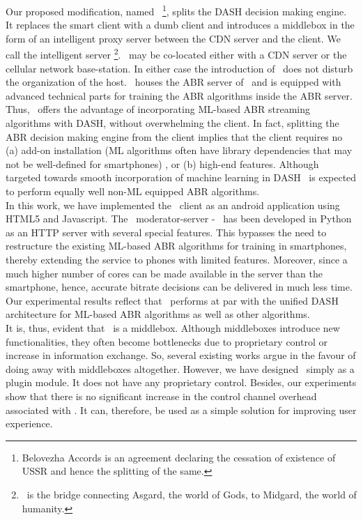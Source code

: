     \indent Our proposed modification, named \bel\ \footnote{Belovezha Accords is an agreement declaring the cessation of existence of USSR and hence the splitting of the same.}, splits the \ac{DASH} decision making engine. It replaces the smart client with a dumb client and introduces a middlebox in the form of an intelligent proxy server between the \ac{CDN} server and the client. We call the intelligent server \servname\footnote{\servname\ is the bridge connecting Asgard, the world of Gods, to Midgard, the world of humanity.}. \servname\ may be co-located either with a \ac{CDN} server  or the cellular network base-station. In either case the introduction of \servname\ does not disturb the organization of the host. \servname\ houses the \ac{ABR} server of~\cite{mao2017neural,Akhtar2018,Sengupta2018} and is equipped with advanced technical parts for training the \ac{ABR} algorithms inside the \ac{ABR} server.  Thus, \bel\ offers the advantage of incorporating \ac{ML}-based \ac{ABR} streaming algorithms with DASH, without overwhelming the client. In fact, splitting the \ac{ABR} decision making engine from the client implies that the client requires no (a) add-on installation (\ac{ML} algorithms often have library dependencies that may not be well-defined for smartphones) , or (b) high-end features. Although targeted towards smooth incorporation of machine learning in \ac{DASH} \bel\ is expected to perform equally well non-\ac{ML} equipped \ac{ABR} algorithms.\\
    \indent In this work, we have implemented  the \bel\ client as an android application using HTML5 and Javascript. The \bel\ moderator-server - \servname\ has been developed in Python as an HTTP server with several special features. This bypasses the need to restructure the existing \ac{ML}-based ABR algorithms for training in smartphones, thereby extending the service to phones with limited features. Moreover, since a much higher number of cores can be made available in the server than the smartphone, hence, accurate bitrate decisions can be delivered in much less time. Our experimental results reflect that \bel\ performs at par with the unified \ac{DASH} architecture for ML-based ABR algorithms as well as other algorithms.  \\
    \indent It is, thus, evident that \servname\ is a middlebox. Although middleboxes introduce new functionalities, they often become bottlenecks due to proprietary control or increase in information exchange. So, several existing works \cite{Sherry2012} argue in the favour of doing away with middleboxes altogether. However, we have designed \servname\ simply as a plugin module. It does not have any proprietary control. Besides, our experiments show that there is no significant increase in the control channel overhead associated with \servname. It can, therefore, be used as a simple solution for improving user experience.

